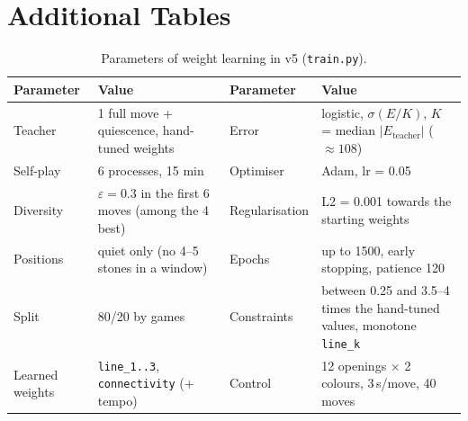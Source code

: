 \documentclass[a4paper,10pt,twocolumn]{article}
\newcommand{\code}[1]{\texttt{#1}}
\begin{document}
\section{Additional Tables}
\begin{table}[h]
\centering
\caption{Parameters of weight learning in v5 (\code{train.py}).}
\label{tab:hyper}
\begin{tabularx}{\textwidth}{@{}lXlX@{}}
\toprule
Parameter & Value & Parameter & Value \\
\midrule
Teacher & 1 full move + quiescence, hand-tuned weights & Error & logistic, $\sigma(E/K)$, $K$ = median $|E_{\text{teacher}}|$ ($\approx108$) \\
Self-play & 6 processes, 15 min & Optimiser & Adam, lr = 0.05 \\
Diversity & $\varepsilon=0.3$ in the first 6 moves (among the 4 best) & Regularisation & L2 = 0.001 towards the starting weights \\
Positions & quiet only (no 4--5 stones in a window) & Epochs & up to 1500, early stopping, patience 120 \\
Split & 80/20 by games & Constraints & between 0.25 and 3.5--4 times the hand-tuned values, monotone \code{line\_k} \\
Learned weights & \code{line\_1..3}, \code{connectivity} (+ tempo) & Control & 12 openings $\times$ 2 colours, 3\,s/move, 40 moves \\
\bottomrule
\end{tabularx}
\end{table}
\end{document}
